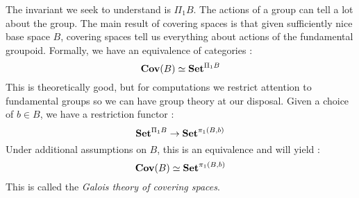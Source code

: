 \documentclass[./main.tex]{subfiles}
\begin{document}
\begin{rmk}
  
  The invariant we seek to understand is $\Pi_1 B$.
  The actions of a group can tell a lot about the group.
  The main result of covering spaces is that 
  given sufficiently nice base space $B$,
  covering spaces tell us everything about actions of the fundamental groupoid.
  Formally, we have an equivalence of categories : 
  \[
    \mathbf{Cov}(B) \simeq \mathbf{Set}^{\Pi_1 B}
  \]
  This is theoretically good,
  but for computations we restrict attention to fundamental groups
  so we can have group theory at our disposal.
  Given a choice of $b \in B$,
  we have a restriction functor : 
  \[
    \mathbf{Set}^{\Pi_1 B} \to \mathbf{Set}^{\pi_1(B,b)}
  \]
  Under additional assumptions on $B$,
  this is an equivalence and will yield : 
  \[
    \mathbf{Cov}(B) \simeq \mathbf{Set}^{\pi_1(B,b)}
  \]
  This is called the \emph{Galois theory of covering spaces}.

\end{rmk}
  
\end{document}
